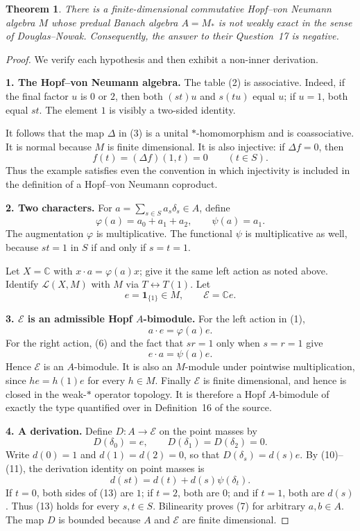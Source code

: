 \documentclass[11pt]{article}
\newtheorem{theorem}{Theorem}
\newcommand{\C}{\mathbb C}
\newcommand{\E}{\mathcal E}
\newcommand{\1}{\mathbf 1}
\begin{document}
\begin{theorem}
There is a finite-dimensional commutative Hopf--von Neumann algebra $M$ whose
predual Banach algebra $A=M_*$ is not weakly exact in the sense of
Douglas--Nowak.  Consequently, the answer to their Question~17 is negative.
\end{theorem}

\begin{proof}
We verify each hypothesis and then exhibit a non-inner derivation.

\smallskip
\noindent\textbf{1. The Hopf--von Neumann algebra.}
The table (2) is associative.  Indeed, if the final factor $u$ is $0$ or
$2$, then both $(st)u$ and $s(tu)$ equal $u$; if $u=1$, both equal $st$.
The element $1$ is visibly a two-sided identity.

It follows that the map $\Delta$ in (3) is a unital $*$-homomorphism and is
coassociative.  It is normal because $M$ is finite dimensional.  It is also
injective: if $\Delta f=0$, then
\[
  f(t)=(\Delta f)(1,t)=0 \qquad(t\in S).
\]
Thus the example satisfies even the convention in which injectivity is
included in the definition of a Hopf--von Neumann coproduct.

\smallskip
\noindent\textbf{2. Two characters.}
For $a=\sum_{s\in S}a_s\delta_s\in A$, define
\[
  \varphi(a)=a_0+a_1+a_2,
  \qquad
  \psi(a)=a_1.
\tag{8}
\]
The augmentation $\varphi$ is multiplicative.  The functional $\psi$ is
multiplicative as well, because $st=1$ in $S$ if and only if $s=t=1$.

Let $X=\C$ with $x\mathbin{\cdot}a=\varphi(a)x$; give it the same left
action as noted above.  Identify $\mathcal L(X,M)$ with $M$ via
$T\leftrightarrow T(1)$.  Let
\[
  e=\1_{\{1\}}\in M,
  \qquad
  \E=\C e.
\tag{9}
\]

\smallskip
\noindent\textbf{3. $\E$ is an admissible Hopf $A$-bimodule.}
For the left action in (1),
\[
  a\mathbin{\cdot}e=\varphi(a)e.
\tag{10}
\]
For the right action, (6) and the fact that $sr=1$ only when $s=r=1$
give
\[
  e\mathbin{\cdot}a=\psi(a)e.
\tag{11}
\]
Hence $\E$ is an $A$-bimodule.  It is also an $M$-module under pointwise
multiplication, since $he=h(1)e$ for every $h\in M$.  Finally $\E$ is
finite dimensional, and hence is closed in the weak-$*$ operator topology.
It is therefore a Hopf $A$-bimodule of exactly the type quantified over in
Definition~16 of the source.

\smallskip
\noindent\textbf{4. A derivation.}
Define $D:A\to\E$ on the point masses by
\[
  D(\delta_0)=e,
  \qquad
  D(\delta_1)=D(\delta_2)=0.
\tag{12}
\]
Write $d(0)=1$ and $d(1)=d(2)=0$, so that
$D(\delta_s)=d(s)e$.  By (10)--(11), the derivation identity on point
masses is
\[
  d(st)=d(t)+d(s)\psi(\delta_t).
\tag{13}
\]
If $t=0$, both sides of (13) are $1$; if $t=2$, both are $0$; and if
$t=1$, both are $d(s)$.  Thus (13) holds for every $s,t\in S$.
Bilinearity proves (7) for arbitrary $a,b\in A$.  The map $D$ is bounded
because $A$ and $\E$ are finite dimensional.


\end{proof}
\end{document}
